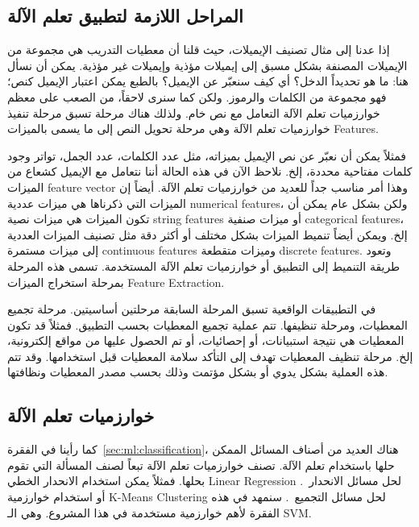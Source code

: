 \subsection{المراحل اللازمة لتطبيق تعلم الآلة}
\label{sec:ml:steps}
إذا عدنا إلى مثال تصنيف الإيميلات، حيث قلنا أن معطيات التدريب هي مجموعة من الإيميلات المصنفة بشكل مسبق إلى إيميلات مؤذية وإيميلات غير مؤذية.
يمكن أن نسأل هنا: ما هو تحديداً الدخل؟ أي كيف سنعبّر عن الإيميل؟ بالطبع يمكن اعتبار الإيميل كنص؛ فهو مجموعة من الكلمات والرموز.
ولكن كما سنرى لاحقاً، من الصعب على معظم خوارزميات تعلم الآلة التعامل مع نص خام. ولذلك هناك مرحلة تسبق مرحلة تنفيذ خوارزميات تعلم الآلة
وهي مرحلة تحويل النص إلى ما يسمى بالميزات \textenglish{Features}.

فمثلاً يمكن أن نعبّر عن نص الإيميل بميزاته، مثل عدد الكلمات، عدد الجمل،
تواتر وجود كلمات مفتاحية محددة، إلخ. نلاحظ الآن في هذه الحالة أننا نتعامل مع الإيميل كشعاع من الميزات \textenglish{feature vector} وهذا أمر مناسب جداً
للعديد من خوارزميات تعلم الآلة. أيضاً إن الميزات التي ذكرناها هي ميزات عددية \textenglish{numerical features}، ولكن بشكل عام يمكن أن تكون الميزات
هي ميزات نصية \textenglish{string features} أو ميزات صنفية \textenglish{categorical features}، إلخ. ويمكن أيضاً تنميط الميزات بشكل مختلف أو أكثر دقة
مثل تصنيف الميزات العددية إلى ميزات مستمرة \textenglish{continuous features} وميزات متقطعة \textenglish{discrete features}. وتعود طريقة التنميط إلى
التطبيق أو خوارزميات تعلم الآلة المستخدمة. تسمى هذه المرحلة بمرحلة استخراج الميزات \textenglish{Feature Extraction}.

في التطبيقات الواقعية تسبق المرحلة السابقة مرحلتين أساسيتين. مرحلة تجميع المعطيات، ومرحلة تنظيفها. تتم عملية تجميع المعطيات بحسب التطبيق.
فمثلاً قد تكون المعطيات هي نتيجة استبيانات، أو إحصائيات، أو تم الحصول عليها من مواقع إلكترونية، إلخ.
مرحلة تنظيف المعطيات تهدف إلى التأكد سلامة المعطيات قبل استخدامها. وقد تتم هذه العملية بشكل يدوي أو بشكل مؤتمت وذلك بحسب مصدر المعطيات ونظافتها.




\subsection{خوارزميات تعلم الآلة}
\label{sec:ml:algs}
كما رأينا في الفقرة~\ref{sec:ml:classification}، هناك العديد من أصناف المسائل الممكن حلها باستخدام تعلم الآلة.
تصنف خوارزميات تعلم الآلة تبعاً لصنف المسألة التي تقوم بحلها. فمثلاً يمكن استخدام الانحدار الخطي
\textenglish{Linear Regression}
لحل مسائل الانحدار~\cite{hands-on}.
أو استخدام خوارزمية \textenglish{K-Means Clustering}  لحل مسائل التجميع~\cite{hands-on}.
سنمهد في هذه الفقرة لأهم خوارزمية مستخدمة في هذا المشروع.
وهي الـ \textenglish{SVM}.


